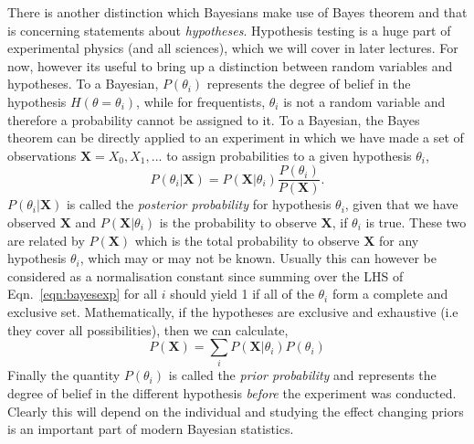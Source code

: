 There is another distinction which Bayesians make use of Bayes theorem and that is concerning statements about \emph{hypotheses}. Hypothesis testing is a huge part of experimental physics (and all sciences), which we will cover in later lectures. For now, however its useful to bring up a distinction between random variables and hypotheses. To a Bayesian, $P(\theta_{i})$ represents the degree of belief in the hypothesis $H(\theta=\theta_i)$, while for frequentists, $\theta_i$ is not a random variable and therefore a probability cannot be assigned to it. To a Bayesian, the Bayes theorem can be directly applied to an experiment in which we have made a set of observations $\mathbf{X}=X_0,X_1,...$ to assign probabilities to a given hypothesis $\theta_i$, 
\begin{equation}\label{eqn:bayesexp}
    P(\theta_i|\mathbf{X}) =  P(\mathbf{X}|\theta_i)\frac{P(\theta_i)}{P(\mathbf{X})}.
\end{equation}
$P(\theta_i|\mathbf{X})$ is called the \emph{posterior probability} for hypothesis $\theta_i$, given that we have observed $\mathbf{X}$ and $P(\mathbf{X}|\theta_i)$ is the probability to observe $\mathbf{X}$, if $\theta_i$ is true. These two are related by $P(\mathbf{X})$ which is the total probability to observe $\mathbf{X}$ for any hypothesis $\theta_i$, which may or may not be known. Usually this can however be considered as a normalisation constant since summing over the LHS of Eqn.~\ref{eqn:bayesexp} for all $i$ should yield 1 if all of the $\theta_i$ form a complete and  exclusive set. Mathematically, if the hypotheses are exclusive and exhaustive (i.e they cover all possibilities), then we can calculate, 
\begin{equation}\label{eqn:norm}
    P(\mathbf{X}) = \sum_{i} P(\mathbf{X}|\theta_i)P(\theta_i)
\end{equation}
Finally the quantity $P(\theta_i)$ is called the \emph{prior probability} and represents the degree of belief in the different hypothesis \emph{before} the experiment was conducted. Clearly this will depend on the individual and studying the effect changing priors is an important part of modern Bayesian statistics. 

